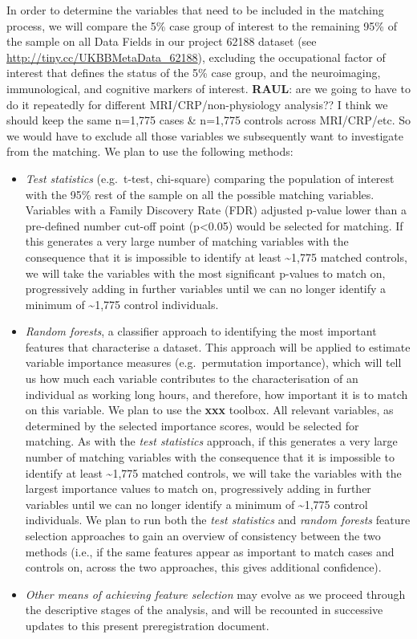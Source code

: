 \documentclass[
]{article}
\begin{document}
In order to determine the variables that need to be included in the
matching process, we will compare the 5\% case group of interest to the
remaining 95\% of the sample on all Data Fields in our project 62188
dataset (see \url{http://tiny.cc/UKBBMetaData_62188}), excluding the
occupational factor of interest that defines the status of the 5\% case
group, and the neuroimaging, immunological, and cognitive markers of
interest. \textbf{RAUL}: are we going to have to do it repeatedly for
different MRI/CRP/non-physiology analysis?? I think we should keep the
same n=1,775 cases \& n=1,775 controls across MRI/CRP/etc. So we would
have to exclude all those variables we subsequently want to investigate
from the matching. We plan to use the following methods:

\begin{itemize}
\item
  \emph{Test statistics} (e.g.~t-test, chi-square) comparing the
  population of interest with the 95\% rest of the sample on all the
  possible matching variables. Variables with a Family Discovery Rate
  (FDR) adjusted p-value lower than a pre-defined number cut-off point
  (p\textless0.05) would be selected for matching. If this generates a
  very large number of matching variables with the consequence that it
  is impossible to identify at least \textasciitilde1,775 matched
  controls, we will take the variables with the most significant
  p-values to match on, progressively adding in further variables until
  we can no longer identify a minimum of \textasciitilde1,775 control
  individuals.
\item
  \emph{Random forests}, a classifier approach to identifying the most
  important features that characterise a dataset. This approach will be
  applied to estimate variable importance measures (e.g.~permutation
  importance), which will tell us how much each variable contributes to
  the characterisation of an individual as working long hours, and
  therefore, how important it is to match on this variable. We plan to
  use the \textbf{xxx} toolbox. All relevant variables, as determined by
  the selected importance scores, would be selected for matching. As
  with the \emph{test statistics} approach, if this generates a very
  large number of matching variables with the consequence that it is
  impossible to identify at least \textasciitilde1,775 matched controls,
  we will take the variables with the largest importance values to match
  on, progressively adding in further variables until we can no longer
  identify a minimum of \textasciitilde1,775 control individuals. We
  plan to run both the \emph{test statistics} and \emph{random forests}
  feature selection approaches to gain an overview of consistency
  between the two methods (i.e., if the same features appear as
  important to match cases and controls on, across the two approaches,
  this gives additional confidence).
\item
  \emph{Other means of achieving feature selection} may evolve as we
  proceed through the descriptive stages of the analysis, and will be
  recounted in successive updates to this present preregistration
  document.
\end{itemize}
\end{document}

